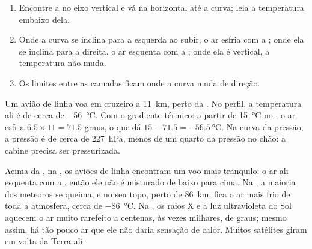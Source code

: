 \begin{method}\label{met:g8:the-atmosphere:profile}
\begin{enumerate}
  \item Encontre a  no eixo vertical e vá na horizontal até a
        curva; leia a temperatura embaixo dela.
  \item Onde a curva se inclina para a esquerda ao subir, o ar esfria com
        a ; onde ela se inclina para a direita, o ar esquenta com
        a ; onde ela é vertical, a temperatura não muda.
  \item Os limites entre as camadas ficam onde a curva muda de direção.
\end{enumerate}
\end{method}

\begin{example}\label{ex:g8:the-atmosphere:airliner}
Um avião de linha voa em cruzeiro a \qty{11}{km}, perto da . No
perfil, a temperatura ali é de cerca de \qty{-56}{\degreeCelsius}. Com o
gradiente térmico: a partir de \qty{15}{\degreeCelsius} no ,
o ar esfria $6.5 \times 11 = 71.5$ graus, o que dá $15 - 71.5 =
\qty{-56.5}{\degreeCelsius}$. Na curva da pressão, a pressão é de cerca
de \qty{227}{hPa}, menos de um quarto da pressão no chão: a cabine
precisa ser pressurizada.
\end{example}

Acima da , na , os aviões de linha encontram um voo
mais tranquilo: o ar ali esquenta com a , então ele não é
misturado de baixo para cima. Na , a maioria dos meteoros se
queima, e no seu topo, perto de \qty{86}{km}, fica o ar mais frio de toda
a atmosfera, cerca de \qty{-86}{\degreeCelsius}. Na , os raios X
e a luz ultravioleta do Sol aquecem o ar muito rarefeito a centenas, às
vezes milhares, de graus; mesmo assim, há tão pouco ar que ele não daria
sensação de calor. Muitos satélites giram em volta da Terra ali.

